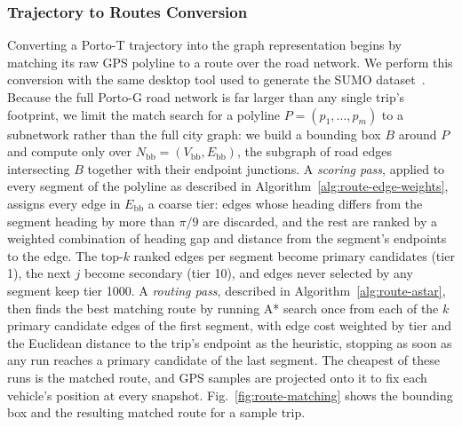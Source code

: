 \subsubsection{Trajectory to Routes Conversion}
Converting a Porto-T trajectory into the graph representation begins by matching its raw GPS polyline to a route over the road network. We perform this conversion with the same desktop tool used to generate the SUMO dataset~\cite{sumo_data_generator}. Because the full Porto-G road network is far larger than any single trip's footprint, we limit the match search for a polyline $P=(p_1,\ldots,p_m)$ to a subnetwork rather than the full city graph: we build a bounding box $B$ around $P$ and compute only over $N_{\mathrm{bb}}=(V_{\mathrm{bb}},E_{\mathrm{bb}})$, the subgraph of road edges intersecting $B$ together with their endpoint junctions. A \emph{scoring pass}, applied to every segment of the polyline as described in Algorithm~\ref{alg:route-edge-weights}, assigns every edge in $E_{\mathrm{bb}}$ a coarse tier: edges whose heading differs from the segment heading by more than $\pi/9$ are discarded, and the rest are ranked by a weighted combination of heading gap and distance from the segment's endpoints to the edge. The top-$k$ ranked edges per segment become primary candidates (tier 1), the next $j$ become secondary (tier 10), and edges never selected by any segment keep tier 1000. A \emph{routing pass}, described in Algorithm~\ref{alg:route-astar}, then finds the best matching route by running A* search once from each of the $k$ primary candidate edges of the first segment, with edge cost weighted by tier and the Euclidean distance to the trip's endpoint as the heuristic, stopping as soon as any run reaches a primary candidate of the last segment. The cheapest of these runs is the matched route, and GPS samples are projected onto it to fix each vehicle's position at every snapshot. Fig.~\ref{fig:route-matching} shows the bounding box and the resulting matched route for a sample trip.

